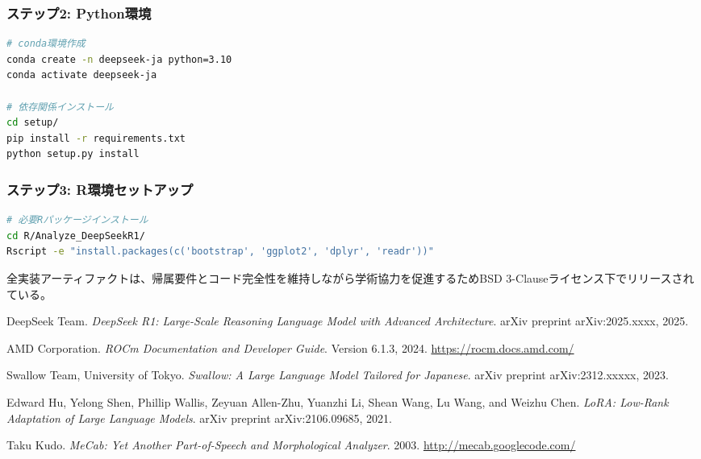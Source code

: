 \documentclass[12pt,a4paper]{article}
\begin{document}
\subsubsection{ステップ2: Python環境}
\begin{lstlisting}[language=bash]
# conda環境作成
conda create -n deepseek-ja python=3.10
conda activate deepseek-ja

# 依存関係インストール
cd setup/
pip install -r requirements.txt
python setup.py install
\end{lstlisting}

\subsubsection{ステップ3: R環境セットアップ}
\begin{lstlisting}[language=bash]
# 必要Rパッケージインストール
cd R/Analyze_DeepSeekR1/
Rscript -e "install.packages(c('bootstrap', 'ggplot2', 'dplyr', 'readr'))"
\end{lstlisting}

全実装アーティファクトは、帰属要件とコード完全性を維持しながら学術協力を促進するためBSD 3-Clauseライセンス下でリリースされている。


\begin{thebibliography}{9}

DeepSeek Team.
\textit{DeepSeek R1: Large-Scale Reasoning Language Model with Advanced Architecture}.
arXiv preprint arXiv:2025.xxxx, 2025.

AMD Corporation.
\textit{ROCm Documentation and Developer Guide}.
Version 6.1.3, 2024.
\url{https://rocm.docs.amd.com/}

Swallow Team, University of Tokyo.
\textit{Swallow: A Large Language Model Tailored for Japanese}.
arXiv preprint arXiv:2312.xxxxx, 2023.

Edward Hu, Yelong Shen, Phillip Wallis, Zeyuan Allen-Zhu, Yuanzhi Li, Shean Wang, Lu Wang, and Weizhu Chen.
\textit{LoRA: Low-Rank Adaptation of Large Language Models}.
arXiv preprint arXiv:2106.09685, 2021.

Taku Kudo.
\textit{MeCab: Yet Another Part-of-Speech and Morphological Analyzer}.
2003.
\url{http://mecab.googlecode.com/}

\end{thebibliography}
\end{document}
